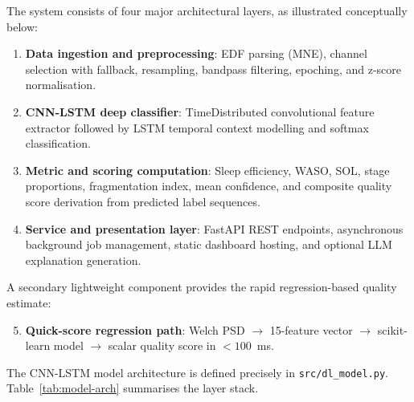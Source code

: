 \documentclass[10pt]{article}
\begin{document}
The system consists of four major architectural layers, as illustrated conceptually below:

\begin{enumerate}
  \item \textbf{Data ingestion and preprocessing}: EDF parsing (MNE), channel selection with fallback, resampling, bandpass filtering, epoching, and z-score normalisation.
  \item \textbf{CNN-LSTM deep classifier}: TimeDistributed convolutional feature extractor followed by LSTM temporal context modelling and softmax classification.
  \item \textbf{Metric and scoring computation}: Sleep efficiency, WASO, SOL, stage proportions, fragmentation index, mean confidence, and composite quality score derivation from predicted label sequences.
  \item \textbf{Service and presentation layer}: FastAPI REST endpoints, asynchronous background job management, static dashboard hosting, and optional LLM explanation generation.
\end{enumerate}

A secondary lightweight component provides the rapid regression-based quality estimate:

\begin{enumerate}
  \setcounter{enumi}{4}
  \item \textbf{Quick-score regression path}: Welch PSD $\rightarrow$ 15-feature vector $\rightarrow$ scikit-learn model $\rightarrow$ scalar quality score in $<100$~ms.
\end{enumerate}

The CNN-LSTM model architecture is defined precisely in \texttt{src/dl\_model.py}. Table~\ref{tab:model-arch} summarises the layer stack.
\end{document}
